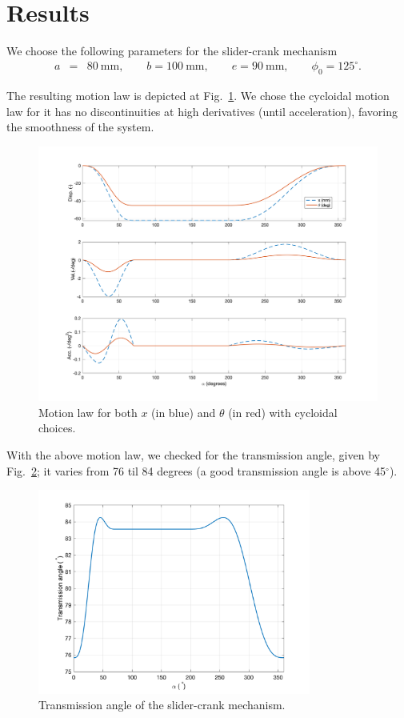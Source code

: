 \documentclass[12pt]{scrartcl}
\begin{document}
\section{Results}

We choose the following parameters for the slider-crank mechanism
\begin{eqnarray*}
	a &=& \SI{80}{\milli\metre}, \qquad b = \SI{100}{\milli\meter}, \qquad e = \SI{90}{\milli\metre}, \qquad \phi_0 = 125^\circ.	
\end{eqnarray*}


The resulting motion law is depicted at Fig.~\ref{fig: cic motion laws}. We chose the cycloidal motion law for it has no discontinuities at high derivatives (until acceleration), favoring the smoothness of the system.
\begin{figure}[htbp!]
	\centering
	\includegraphics[width=1\textwidth]{Pictures/motionLaw.png}
	\caption{Motion law for both $x$ (in blue) and $\theta$ (in red) with cycloidal choices.}
	\label{fig: cic motion laws}
\end{figure}

With the above motion law, we checked for the transmission angle, given by Fig.~\ref{fig: trans angle}; it varies from 76 til 84 degrees (a good transmission angle is above 45$^\circ$).
\begin{figure}
	\centering
	\includegraphics[width=0.8\textwidth]{Pictures/transmissionAngle.png}
	\caption{Transmission angle of the slider-crank mechanism.}
	\label{fig: trans angle}
\end{figure}
 
\end{document}
